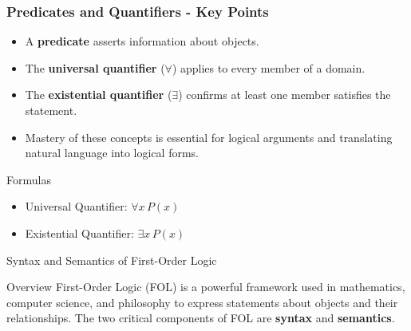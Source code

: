 \documentclass[aspectratio=169]{beamer}
\begin{document}
\begin{frame}[fragile]
    \frametitle{Predicates and Quantifiers - Key Points}
    \begin{itemize}
        \item A \textbf{predicate} asserts information about objects.
        \item The \textbf{universal quantifier} (\( \forall \)) applies to every member of a domain.
        \item The \textbf{existential quantifier} (\( \exists \)) confirms at least one member satisfies the statement.
        \item Mastery of these concepts is essential for logical arguments and translating natural language into logical forms.
    \end{itemize}

    \begin{block}{Formulas}
        \begin{itemize}
            \item Universal Quantifier: \( \forall x \, P(x) \)
            \item Existential Quantifier: \( \exists x \, P(x) \)
        \end{itemize}
    \end{block}
\end{frame}

\begin{frame}[fragile]{Syntax and Semantics of First-Order Logic}
    \begin{block}{Overview}
        First-Order Logic (FOL) is a powerful framework used in mathematics, computer science, and philosophy to express statements about objects and their relationships. The two critical components of FOL are \textbf{syntax} and \textbf{semantics}.
    \end{block}
\end{frame}
\end{document}
